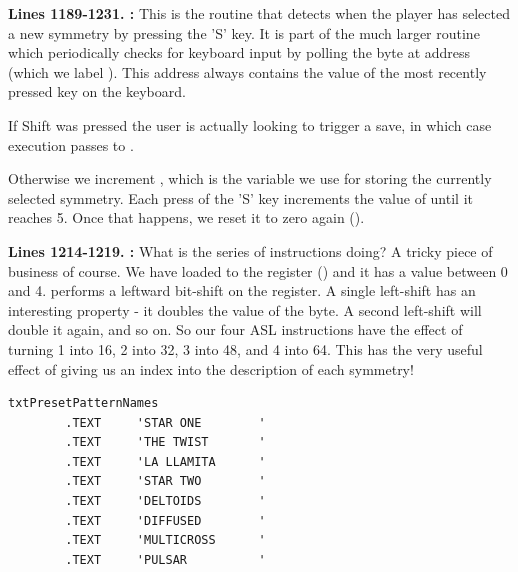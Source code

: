\textbf{Lines 1189-1231. :} This is the routine that detects when the player has selected a new
symmetry by pressing the 'S' key. It is part of the much larger routine  which periodically checks
for keyboard input by polling the byte at address  (which we label ). This address always
contains the value of the most recently pressed key on the keyboard.

If Shift was pressed the user is actually looking to trigger a save, in which case execution passes to .

Otherwise we increment , which is the variable we use for storing the currently selected symmetry.
Each press of the 'S' key increments the value of  until it reaches 5. Once that happens, we 
reset it to zero again ().

\textbf{Lines 1214-1219. :} What is the series of  instructions doing? A tricky
piece of business of course. We have loaded  to the  register () and it has a value between 0 and 4.
 performs a leftward bit-shift on the  register. A single left-shift has an interesting property - it doubles the
value of the byte. A second left-shift will double it again, and so on. So our four {ASL} instructions have the effect of turning 1 into
16, 2 into 32, 3 into 48, and 4 into 64. This has the very useful effect of giving us an index into the description of each symmetry!

\begin{lstlisting}
txtPresetPatternNames
        .TEXT     'STAR ONE        '
        .TEXT     'THE TWIST       '
        .TEXT     'LA LLAMITA      '
        .TEXT     'STAR TWO        '
        .TEXT     'DELTOIDS        '
        .TEXT     'DIFFUSED        '
        .TEXT     'MULTICROSS      '
        .TEXT     'PULSAR          '
\end{lstlisting}

